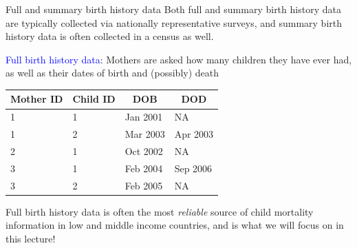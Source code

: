 \documentclass[10pt,t]{beamer}
\begin{document}
\begin{frame}{Full and summary birth history data}
Both full and summary birth history data are typically collected via nationally representative surveys, and summary birth history data is often collected in a census as well.

\vspace{0.3cm}

\textcolor{blue}{Full birth history data}: Mothers are asked how many children they have ever had, as well as their dates of birth and (possibly) death

\vspace{0.3cm} \pause

\begin{table}[]
	\begin{tabular}{l|l|l|l}
		\multicolumn{1}{c|}{Mother ID} & \multicolumn{1}{c|}{Child ID} & \multicolumn{1}{c|}{DOB} & \multicolumn{1}{c}{DOD} \\ \hline
		1                              & 1                             & Jan 2001                 & NA                      \\
		1                              & 2                             & Mar 2003                 & Apr 2003                \\
		2                              & 1                             & Oct 2002                 & NA                      \\
		3                              & 1                             & Feb 2004                 & Sep 2006                \\
		3                              & 2                             & Feb 2005                 & NA                     
	\end{tabular}
\end{table}

\pause Full birth history data is often the most \textit{reliable} source of child mortality information in low and middle income countries, and is what we will focus on in this lecture!

\end{frame}
\end{document}
